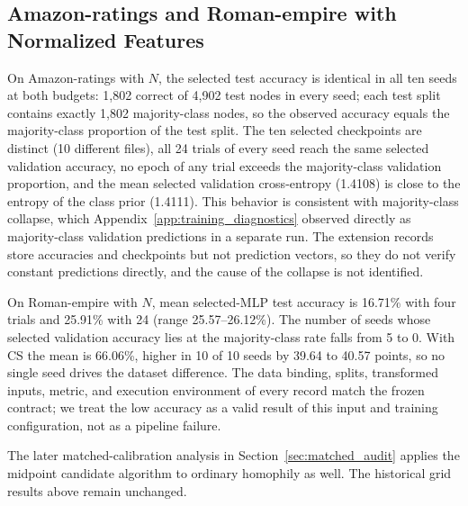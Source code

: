 \subsection{Amazon-ratings and Roman-empire with Normalized Features}

On Amazon-ratings with $N$, the selected test accuracy is identical in all ten seeds at both budgets: 1,802 correct of 4,902 test nodes in every seed; each test split contains exactly 1,802 majority-class nodes, so the observed accuracy equals the majority-class proportion of the test split. The ten selected checkpoints are distinct (10 different files), all 24 trials of every seed reach the same selected validation accuracy, no epoch of any trial exceeds the majority-class validation proportion, and the mean selected validation cross-entropy (1.4108) is close to the entropy of the class prior (1.4111). This behavior is consistent with majority-class collapse, which Appendix~\ref{app:training_diagnostics} observed directly as majority-class validation predictions in a separate run. The extension records store accuracies and checkpoints but not prediction vectors, so they do not verify constant predictions directly, and the cause of the collapse is not identified.

On Roman-empire with $N$, mean selected-MLP test accuracy is 16.71\% with four trials and 25.91\% with 24 (range 25.57--26.12\%). The number of seeds whose selected validation accuracy lies at the majority-class rate falls from 5 to 0. With CS the mean is 66.06\%, higher in 10 of 10 seeds by 39.64 to 40.57 points, so no single seed drives the dataset difference. The data binding, splits, transformed inputs, metric, and execution environment of every record match the frozen contract; we treat the low accuracy as a valid result of this input and training configuration, not as a pipeline failure.

The later matched-calibration analysis in Section~\ref{sec:matched_audit} applies the midpoint candidate algorithm to ordinary homophily as well. The historical grid results above remain unchanged.
